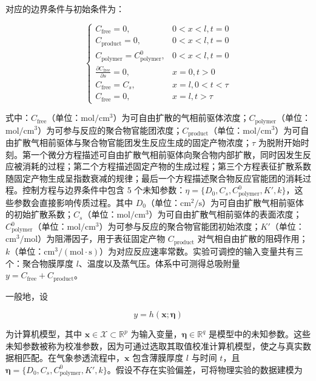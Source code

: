 \documentclass{ctexart}
\begin{document}
对应的边界条件与初始条件为：

\begin{equation*}
\begin{cases}
C_{\text{free}}=0,&0<x<l,t=0\\
C_{\text{product}}=0,&0<x<l,t=0\\
C_{\text{polymer}}=C_{\text{polymer}}^{0},&0<x<l,t=0\\
\frac{\partial C_{\text{free}}}{\partial s}=0,&x=0,t>0\\
C_{\text{free}}=C_s,&x=l,0<t<\tau\\
C_{\text{free}}=0,&x=l,t>\tau
\end{cases}\tag{9.2}
\end{equation*}

式中：$C_{\text{free}}$（单位：$\mathrm{mol/cm^3}$）为可自由扩散的气相前驱体浓度；$C_{\text{polymer}}$（单位：$\mathrm{mol/cm^3}$）为可参与反应的聚合物官能团浓度；$C_{\text{product}}$（单位：$\mathrm{mol/cm^3}$）为可自由扩散气相前驱体与聚合物官能团发生反应生成的固定产物浓度；$\tau$ 为脱附开始时刻。第一个微分方程描述可自由扩散气相前驱体向聚合物内部扩散，同时因发生反应被消耗的过程；第二个方程描述固定产物的生成过程；第三个方程表征扩散系数随固定产物生成呈指数衰减的规律；最后一个方程描述聚合物反应官能团的消耗过程。控制方程与边界条件中包含 5 个未知参数：$\eta=\{D_0,C_s,C_{\text{polymer}}^{0},K',k\}$，这些参数会直接影响传质过程。其中 $D_0$（单位：$\mathrm{cm^2/s}$）为可自由扩散气相前驱体的初始扩散系数；$C_s$（单位：$\mathrm{mol/cm^3}$）为可自由扩散气相前驱体的表面浓度；$C_{\text{polymer}}^{0}$（单位：$\mathrm{mol/cm^3}$）为可参与反应的聚合物官能团初始浓度；$K'$（单位：$\mathrm{cm^3/mol}$）为阻滞因子，用于表征固定产物 $C_{\text{product}}$ 对气相自由扩散的阻碍作用；$k$（单位：$\mathrm{cm^3/(mol\cdot s)}$）为对应反应速率常数。实验可调控的输入变量共有三个：聚合物膜厚度 $l$、温度以及蒸气压。体系中可测得总吸附量 $y=C_{\text{free}}+C_{\text{product}}$。

一般地，设

\begin{equation*}
y=h(\boldsymbol{x};\boldsymbol{\eta})
\tag{9.3}
\end{equation*}

为计算机模型，其中 $\boldsymbol{x}\in\mathcal{X}\subset\mathbb{R}^p$ 为输入变量，$\boldsymbol{\eta}\in\mathbb{R}^q$ 是模型中的未知参数。这些未知参数被称为校准参数，因为可通过选取其取值校准计算机模型，使之与真实数据相匹配。在气象参透流程中，$\boldsymbol{x}$ 包含薄膜厚度 $l$ 与时间 $t$，且 $\boldsymbol{\eta}=\{D_0,C_s,C^0_\text{polymer},K',k\}$。假设不存在实验偏差，可将物理实验的数据建模为
\end{document}
